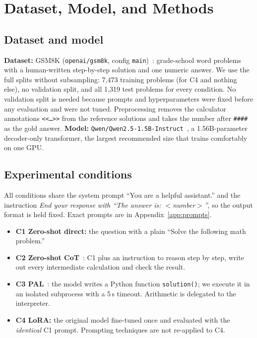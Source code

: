 \documentclass[conference]{IEEEtran}
\begin{document}
\section{Dataset, Model, and Methods}
\subsection{Dataset and model}
\textbf{Dataset:} GSM8K (\texttt{openai/gsm8k}, config \texttt{main})~\cite{cobbe2021gsm8k}: grade-school
word problems with a human-written step-by-step solution and one numeric answer. We use the full splits
without subsampling: 7{,}473 training problems (for C4 and nothing else), no validation split, and all
1{,}319 test problems for every condition. No validation split is needed because prompts and
hyperparameters were fixed before any evaluation and were not tuned. Preprocessing removes the calculator
annotations \texttt{<<\ldots>>} from the reference solutions and takes the number after \texttt{\#\#\#\#}
as the gold answer. \textbf{Model:} \texttt{Qwen/Qwen2.5-1.5B-Instruct}~\cite{qwen25}, a 1.56B-parameter
decoder-only transformer, the largest recommended size that trains comfortably on one GPU.

\subsection{Experimental conditions}
All conditions share the system prompt ``You are a helpful assistant.'' and the instruction \emph{End your
response with ``The answer is: $<$number$>$''}, so the output format is held fixed. Exact prompts are in
Appendix~\ref{app:prompts}.
\begin{itemize}
\item \textbf{C1 Zero-shot direct:} the question with a plain ``Solve the following math problem.''
\item \textbf{C2 Zero-shot CoT}~\cite{kojima2022large,wei2022chain}: C1 plus an instruction to reason step
by step, write out every intermediate calculation and check the result.
\item \textbf{C3 PAL}~\cite{gao2023pal}: the model writes a Python function \texttt{solution()}; we execute it
in an isolated subprocess with a 5\,s timeout. Arithmetic is delegated to the interpreter.
\item \textbf{C4 LoRA:} the original model fine-tuned once and evaluated with the \emph{identical} C1 prompt.
Prompting techniques are not re-applied to C4.
\end{itemize}
\end{document}
